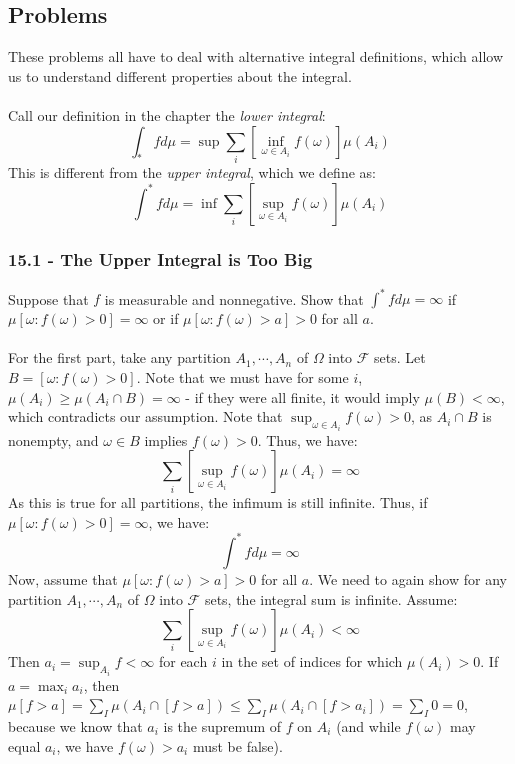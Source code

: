 \documentclass[12pt,a4paper]{article}
\newcommand{\1}[1]{\mathbbm{1}\left\{ #1 \right\}}
\newcommand{\fcal}{\mathcal{F}}
\begin{document}
\subsection{Problems}
These problems all have to deal with alternative integral definitions, which allow us to understand different properties about the integral.
\\\\
Call our definition in the chapter the \textit{lower integral}:
$$
	\int_* f d\mu = \sup \sum_i \left[\inf_{\omega \in A_i} f(\omega)\right] \mu(A_i)
$$
This is different from the \textit{upper integral}, which we define as:
$$
	\int^* f d\mu = \inf \sum_i \left[\sup_{\omega \in A_i} f(\omega)\right] \mu(A_i)
$$

\subsubsection{15.1 - The Upper Integral is Too Big} Suppose that $f$ is measurable and nonnegative. Show that $\int^* f d\mu = \infty$ if $\mu[\omega : f(\omega) > 0] = \infty$ or if $\mu[\omega : f(\omega) > a] > 0$ for all $a$.
\\\\
For the first part, take any partition $A_1, \cdots, A_n$ of $\Omega$ into $\fcal$ sets. Let $B = [\omega : f(\omega) > 0]$. Note that we must have for some $i$, $\mu(A_i) \geq \mu(A_i \cap B) = \infty$ - if they were all finite, it would imply $\mu(B) < \infty$, which contradicts our assumption. Note that $\sup_{\omega \in A_i} f(\omega) > 0$, as $A_i \cap B$ is nonempty, and $\omega \in B$ implies $f(\omega) > 0$. Thus, we have:
$$
	\sum_i \left[\sup_{\omega \in A_i} f(\omega)\right] \mu(A_i) = \infty
$$
As this is true for all partitions, the infimum is still infinite. Thus, if $\mu[\omega : f(\omega) > 0] = \infty$, we have:
$$
	\int^* f d\mu = \infty
$$
Now, assume that $\mu[\omega : f(\omega) > a] > 0$ for all $a$. We need to again show for any partition $A_1, \cdots, A_n$ of $\Omega$ into $\fcal$ sets, the integral sum is infinite. Assume:
$$
	\sum_i \left[\sup_{\omega \in A_i} f(\omega)\right] \mu(A_i) < \infty
$$
Then $a_i = \sup_{A_i} f < \infty$ for each $i$ in the set of indices for which $\mu(A_i) > 0$. If $a = \max_i a_i$, then $\mu[f > a] = \sum_I \mu(A_i \cap [f > a]) \leq \sum_I \mu(A_i \cap [f > a_i]) = \sum_I 0 = 0$, because we know that $a_i$ is the supremum of $f$ on $A_i$ (and while $f(\omega)$ may equal $a_i$, we have $f(\omega) > a_i$ must be false).
\\\\
\end{document}
